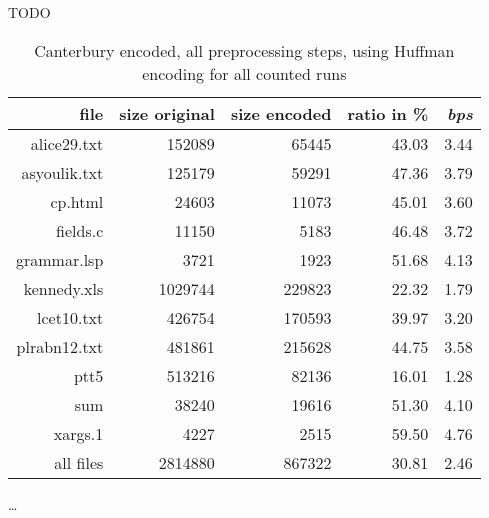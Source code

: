 \par{
	TODO
}
	\begin{table}[h]
	\centering
	\begin{tabular}{r|r|r|r|r}	
		file & size original & size encoded & ratio in \% & \textit{bps}\\
		\hline
alice29.txt & 152089 & 65445 & 43.03 & 3.44 \\
asyoulik.txt & 125179 & 59291 & 47.36 & 3.79 \\
cp.html & 24603 & 11073 & 45.01 & 3.60 \\
fields.c & 11150 & 5183 & 46.48 & 3.72 \\
grammar.lsp & 3721 & 1923 & 51.68 & 4.13 \\
kennedy.xls & 1029744 & 229823 & 22.32 & 1.79 \\
lcet10.txt & 426754 & 170593 & 39.97 & 3.20 \\
plrabn12.txt & 481861 & 215628 & 44.75 & 3.58 \\
ptt5 & 513216 & 82136 & 16.01 & 1.28 \\
sum & 38240 & 19616 & 51.30 & 4.10 \\
xargs.1 & 4227 & 2515 & 59.50 & 4.76 \\
		\hline
		all files & 2814880 & 867322 & 30.81 & 2.46
	\end{tabular}
	\caption{Canterbury encoded, all preprocessing steps, using Huffman encoding for all counted runs}
	\label{tab:t100:Canterbury encoded, all preprocessing steps, using Huffman encoding for all counted runs}
\end{table}
\ldots

